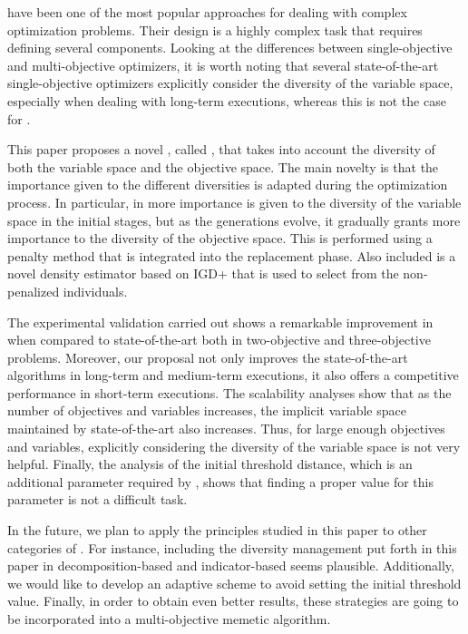 \EAS{} have been one of the most popular approaches for dealing with complex optimization problems.
%
Their design is a highly complex task that requires defining several components.
%
Looking at the differences between single-objective and multi-objective optimizers, it is worth noting
that several state-of-the-art single-objective optimizers explicitly consider the diversity of the variable space, especially
when dealing with long-term executions, whereas this is not the case for \MOEAS{}.

This paper proposes a novel \MOEA{}, called \VSDMOEA{}, that takes into account the diversity of both the variable space
and the objective space.
%
The main novelty is that the importance given to the different diversities is adapted during the optimization process.
%
In particular, in \VSDMOEA{} more importance is given to the diversity of the variable space in the initial stages,
but as the generations evolve, it gradually grants more importance to the diversity of the objective space.
%
This is performed using a penalty method that is integrated into the replacement phase.
%
Also included is a novel density estimator based on IGD+ that is used to select from the non-penalized individuals.

The experimental validation carried out shows a remarkable improvement in \VSDMOEA{} when compared to state-of-the-art \MOEAS{} both in
two-objective and three-objective problems.
%
Moreover, our proposal not only improves the state-of-the-art algorithms in long-term and medium-term executions,
it also offers a competitive performance in short-term executions.
%
The scalability analyses show that as the number of objectives and variables increases, the implicit variable space maintained by state-of-the-art
\MOEAS{} also increases.
%
Thus, for large enough objectives and variables, explicitly considering the diversity of the variable space is not very helpful.
%
Finally, the analysis of the initial threshold distance, which is an additional parameter required by \VSDMOEA{}, shows that finding a proper
value for this parameter is not a difficult task.

In the future, we plan to apply the principles studied in this paper to other categories of \MOEAS{}.
%
For instance, including the diversity management put forth in this paper in decomposition-based and indicator-based \MOEAS{} seems plausible.
%
Additionally, we would like to develop an adaptive scheme to avoid setting the initial threshold value.
%
Finally, in order to obtain even better results, these strategies are going to be incorporated into a multi-objective memetic algorithm.
%
